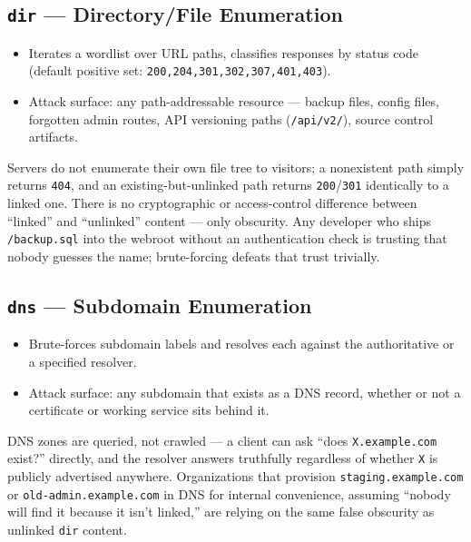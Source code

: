 \documentclass[11pt]{article}
\begin{document}
\subsection{\texttt{dir} --- Directory/File Enumeration}
\begin{itemize}
    \item Iterates a wordlist over URL paths, classifies responses by status code (default positive set: \texttt{200,204,301,302,307,401,403}).
    \item Attack surface: any path-addressable resource --- backup files, config files, forgotten admin routes, API versioning paths (\texttt{/api/v2/}), source control artifacts.
\end{itemize}
\begin{causebox}
Servers do not enumerate their own file tree to visitors; a nonexistent path simply returns \texttt{404}, and an existing-but-unlinked path returns \texttt{200}/\texttt{301} identically to a linked one. There is no cryptographic or access-control difference between ``linked'' and ``unlinked'' content --- only obscurity. Any developer who ships \texttt{/backup.sql} into the webroot without an authentication check is trusting that nobody guesses the name; brute-forcing defeats that trust trivially.
\end{causebox}

\subsection{\texttt{dns} --- Subdomain Enumeration}
\begin{itemize}
    \item Brute-forces subdomain labels and resolves each against the authoritative or a specified resolver.
    \item Attack surface: any subdomain that exists as a DNS record, whether or not a certificate or working service sits behind it.
\end{itemize}
\begin{causebox}
DNS zones are queried, not crawled --- a client can ask ``does \texttt{X.example.com} exist?'' directly, and the resolver answers truthfully regardless of whether \texttt{X} is publicly advertised anywhere. Organizations that provision \texttt{staging.example.com} or \texttt{old-admin.example.com} in DNS for internal convenience, assuming ``nobody will find it because it isn't linked,'' are relying on the same false obscurity as unlinked \texttt{dir} content.
\end{causebox}
\end{document}

